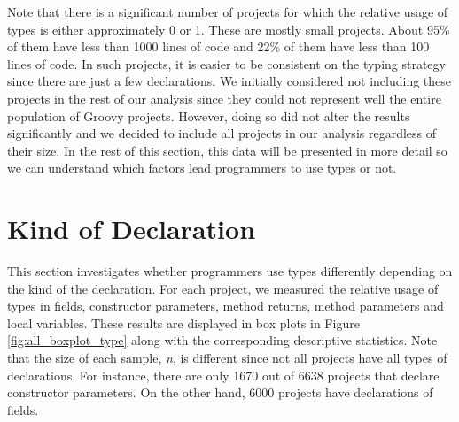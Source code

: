 \documentclass[msc]{ppgccufmg}
\begin{document}
Note that there is a significant number of projects for which the relative usage of types is either approximately 0 or 1.
These are mostly small projects.
About 95\% of them have less than 1000 lines of code and 22\% of them have less than 100 lines of code.
In such projects, it is easier to be consistent on the typing strategy since there are just a few declarations.
We initially considered not including these projects in the rest of our analysis since they could not represent well the entire population of Groovy projects.
However, doing so did not alter the results significantly and we decided to include all projects in our analysis regardless of their size.
In the rest of this section, this data will be presented in more detail so we can understand which factors lead programmers to use types or not.


\section{Kind of Declaration\label{sec:results-type}}
This section investigates whether programmers use types differently depending on the kind of the declaration.
For each project, we measured the relative usage of types in fields, constructor parameters, method returns, method parameters and local variables.
These results are displayed in box plots in Figure \ref{fig:all_boxplot_type} along with the corresponding descriptive statistics.
Note that the size of each sample, \emph{n}, is different since not all projects have all types of declarations. 
For instance, there are only 1670 out of 6638 projects that declare constructor parameters.
On the other hand, 6000 projects have declarations of fields.
\end{document}
